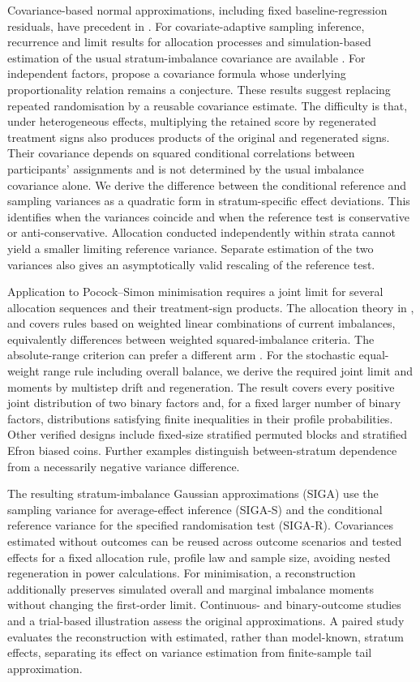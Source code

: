 \documentclass[12pt,a4paper]{article}
\theoremstyle{definition}
\begin{document}
Covariance-based normal approximations, including fixed baseline-regression residuals, have precedent in \citet{Smith1984}. For covariate-adaptive sampling inference, recurrence and limit results for allocation processes and simulation-based estimation of the usual stratum-imbalance covariance are available \citep{HuHu2012,HuZhang2020,ZhaoEtAl2024}. For independent factors, \citet{KuznetsovaEtAlInPress} propose a covariance formula whose underlying proportionality relation remains a conjecture. These results suggest replacing repeated randomisation by a reusable covariance estimate. The difficulty is that, under heterogeneous effects, multiplying the retained score by regenerated treatment signs also produces products of the original and regenerated signs. Their covariance depends on squared conditional correlations between participants' assignments and is not determined by the usual imbalance covariance alone. We derive the difference between the conditional reference and sampling variances as a quadratic form in stratum-specific effect deviations. This identifies when the variances coincide and when the reference test is conservative or anti-conservative. Allocation conducted independently within strata cannot yield a smaller limiting reference variance. Separate estimation of the two variances also gives an asymptotically valid rescaling of the reference test.

Application to Pocock--Simon minimisation requires a joint limit for several allocation sequences and their treatment-sign products. The allocation theory in \citet{HuHu2012}, \citet{HuZhang2020} and \citet{ZhaoEtAl2024} covers rules based on weighted linear combinations of current imbalances, equivalently differences between weighted squared-imbalance criteria. The absolute-range criterion can prefer a different arm \citep{CoartEtAl2023}. For the stochastic equal-weight range rule including overall balance, we derive the required joint limit and moments by multistep drift and regeneration. The result covers every positive joint distribution of two binary factors and, for a fixed larger number of binary factors, distributions satisfying finite inequalities in their profile probabilities. Other verified designs include fixed-size stratified permuted blocks and stratified Efron biased coins. Further examples distinguish between-stratum dependence from a necessarily negative variance difference.

The resulting stratum-imbalance Gaussian approximations (SIGA) use the sampling variance for average-effect inference (SIGA-S) and the conditional reference variance for the specified randomisation test (SIGA-R). Covariances estimated without outcomes can be reused across outcome scenarios and tested effects for a fixed allocation rule, profile law and sample size, avoiding nested regeneration in power calculations. For minimisation, a reconstruction additionally preserves simulated overall and marginal imbalance moments without changing the first-order limit. Continuous- and binary-outcome studies and a trial-based illustration assess the original approximations. A paired study evaluates the reconstruction with estimated, rather than model-known, stratum effects, separating its effect on variance estimation from finite-sample tail approximation.
\end{document}
